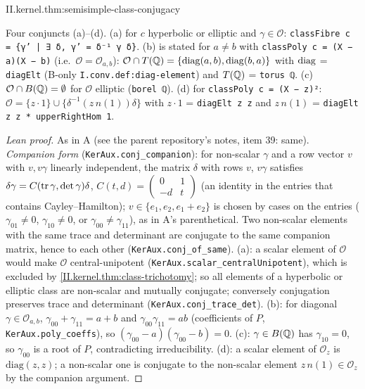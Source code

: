 \begin{theorem}
\end{theorem}
\begin{tfformal}{II.kernel.thm:semisimple-class-conjugacy}
\begin{tffidelity}
Four conjuncts (a)--(d). (a) for $c$ hyperbolic or elliptic and $\gamma\in\mathcal O$: \texttt{classFibre c = \{γ' | ∃ δ, γ' = δ⁻¹ γ δ\}}. (b) is stated for $a\ne b$ with \texttt{classPoly c = (X − a)(X − b)} (i.e.\ $\mathcal O=\mathcal O_{a,b}$): $\mathcal O\cap T(\mathbb{Q})=\{\operatorname{diag}(a,b),\operatorname{diag}(b,a)\}$ with $\operatorname{diag}$ = \texttt{diagElt} (B-only \texttt{I.conv.def:diag-element}) and $T(\mathbb{Q})$ = \texttt{torus ℚ}. (c) $\mathcal O\cap B(\mathbb{Q})=\emptyset$ for $\mathcal O$ elliptic (\texttt{borel ℚ}). (d) for \texttt{classPoly c = (X − z)²}: $\mathcal O=\{z\cdot1\}\cup\{\delta^{-1}(z\,n(1))\delta\}$ with $z\cdot1$ = \texttt{diagElt z z} and $z\,n(1)$ = \texttt{diagElt z z * upperRightHom 1}.
\end{tffidelity}
\end{tfformal}
\begin{proof}[Lean proof]
As in A (see the parent repository's notes, item 39: same). \emph{Companion form} (\texttt{KerAux.conj\_companion}): for non-scalar $\gamma$ and a row vector $v$ with $v,v\gamma$ linearly independent, the matrix $\delta$ with rows $v$, $v\gamma$ satisfies $\delta\gamma=C(\operatorname{tr}\gamma,\det\gamma)\delta$, $C(t,d)=\left(\begin{smallmatrix}0&1\\-d&t\end{smallmatrix}\right)$ (an identity in the entries that contains Cayley--Hamilton); $v\in\{e_1,e_2,e_1+e_2\}$ is chosen by cases on the entries ($\gamma_{01}\ne0$, $\gamma_{10}\ne0$, or $\gamma_{00}\ne\gamma_{11}$), as in A's parenthetical. Two non-scalar elements with the same trace and determinant are conjugate to the same companion matrix, hence to each other (\texttt{KerAux.conj\_of\_same}). (a): a scalar element of $\mathcal O$ would make $\mathcal O$ central-unipotent (\texttt{KerAux.scalar\_centralUnipotent}), which is excluded by \cref{II.kernel.thm:class-trichotomy}; so all elements of a hyperbolic or elliptic class are non-scalar and mutually conjugate; conversely conjugation preserves trace and determinant (\texttt{KerAux.conj\_trace\_det}). (b): for diagonal $\gamma\in\mathcal O_{a,b}$, $\gamma_{00}+\gamma_{11}=a+b$ and $\gamma_{00}\gamma_{11}=ab$ (coefficients of $P$, \texttt{KerAux.poly\_coeffs}), so $(\gamma_{00}-a)(\gamma_{00}-b)=0$. (c): $\gamma\in B(\mathbb{Q})$ has $\gamma_{10}=0$, so $\gamma_{00}$ is a root of $P$, contradicting irreducibility. (d): a scalar element of $\mathcal O_z$ is $\mathrm{diag}(z,z)$; a non-scalar one is conjugate to the non-scalar element $z\,n(1)\in\mathcal O_z$ by the companion argument.
\end{proof}
